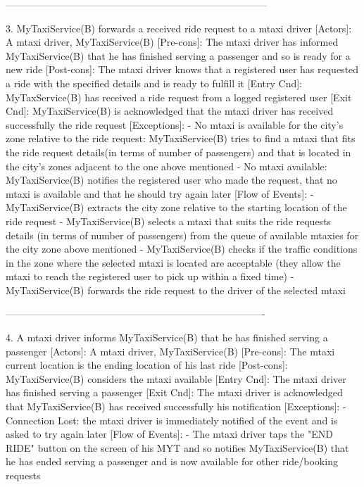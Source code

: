 \documentclass[11pt]{article} %
\begin{document}
      --------------------------------------------------------------------------------

      3. MyTaxiService(B) forwards a received ride request to a mtaxi driver
        [Actors]: A mtaxi driver, MyTaxiService(B)
        [Pre-cons]: The mtaxi driver has informed MyTaxiService(B) that he has finished serving a passenger and so is
        ready for a new ride
        [Post-cons]: The mtaxi driver knows that a registered user has requested a ride with the specified
        details and is ready to fulfill it
        [Entry Cnd]: MyTaxService(B) has received a ride request from a logged registered user
        [Exit Cnd]: MyTaxiService(B) is acknowledged that the mtaxi driver has received successfully the ride request
        [Exceptions]:
          - No mtaxi is available for the city's zone relative to the ride request: MyTaxiService(B) tries
          to find a mtaxi that fits the ride request details(in terms of number of passengers) and that is located in the city's zones adjacent
          to the one above mentioned
          - No mtaxi available: MyTaxiService(B) notifies the registered user who made the request, that
          no mtaxi is available and that he should try again later
        [Flow of Events]:
          - MyTaxiService(B) extracts the city zone relative to the starting location of the ride request
          - MyTaxiService(B) selects a mtaxi that suits the ride requests details (in terms of number of passengers) from the queue of available mtaxies
            for the city zone above mentioned
          - MyTaxiService(B) checks if the traffic conditions in the zone where the selected mtaxi is located are acceptable
          (they allow the mtaxi to reach the registered user to pick up within a fixed time)
          - MyTaxiService(B) forwards the ride request to the driver of the selected mtaxi


      -------------------------------------------------------------------------------

      4. A mtaxi driver informs MyTaxiService(B) that he has finished serving a passenger
        [Actors]: A mtaxi driver, MyTaxiService(B)
        [Pre-cons]: The mtaxi current location is the ending location of his last ride
        [Post-cons]: MyTaxiService(B) considers the mtaxi available
        [Entry Cnd]: The mtaxi driver has finished serving a passenger
        [Exit Cnd]: The mtaxi driver is acknowledged that MyTaxiService(B) has received successfully his
        notification
        [Exceptions]:
          - Connection Lost: the mtaxi driver is immediately notified of the event and is asked to try again
          later
        [Flow of Events]:
          - The mtaxi driver taps the "END RIDE" button on the screen of his MYT and so notifies MyTaxiService(B) that
          he has ended serving a passenger and is now available for other ride/booking requests
\end{document}

